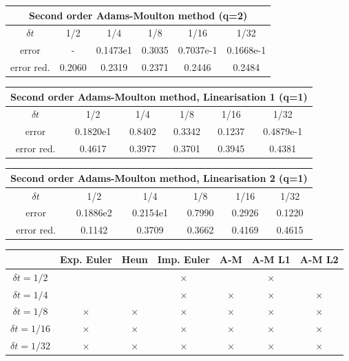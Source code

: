 \documentclass[a4paper,10pt]{article}
\begin{document}
\begin{center}
\vspace{5mm}

\begin{tabular}{ | c | c | c | c | c | c |}
		\hline
		\multicolumn{6}{|c|}{Second order Adams-Moulton method (q=2)} \\
		\hline
		$\delta t$ & 1/2 & 1/4 & 1/8 & 1/16 & 1/32\\
		\hline
		error & - & 0.1473e1 & 0.3035 & 0.7037e-1 & 0.1668e-1\\
		\hline
		error red.& 0.2060 & 0.2319 & 0.2371 & 0.2446 & 0.2484\\
		\hline
\end{tabular}

\vspace{5mm}

\begin{tabular}{ | c | c | c | c | c | c |}
		\hline
		\multicolumn{6}{|c|}{Second order Adams-Moulton method, Linearisation 1 (q=1)} \\
		\hline
		$\delta t$ & 1/2 & 1/4 & 1/8 & 1/16 & 1/32\\
		\hline
		error & 0.1820e1 & 0.8402 & 0.3342 & 0.1237 & 0.4879e-1\\
		\hline
		error red.& 0.4617 & 0.3977 & 0.3701 & 0.3945 & 0.4381\\
		\hline
\end{tabular}

\vspace{5mm}

\begin{tabular}{ | c | c | c | c | c | c |}
		\hline
		\multicolumn{6}{|c|}{Second order Adams-Moulton method, Linearisation 2 (q=1)} \\
		\hline
		$\delta t$ & 1/2 & 1/4 & 1/8 & 1/16 & 1/32\\
		\hline
		error & 0.1886e2 & 0.2154e1 & 0.7990 & 0.2926 & 0.1220\\
		\hline
		error red.& 0.1142 & 0.3709 & 0.3662 & 0.4169 & 0.4615\\
		\hline
\end{tabular}

\vspace{5mm}

\begin{tabular}{ | c | c | c | c | c | c | c |}
		\hline
		& Exp. Euler & Heun & Imp. Euler & A-M & A-M L1 & A-M L2\\
		\hline
		$\delta t = 1/2$&&&$\times$&&$\times$&\\
		\hline
		$\delta t = 1/4$&&&$\times$&$\times$&$\times$&$\times$\\
		\hline
		$\delta t = 1/8$&$\times$&$\times$&$\times$&$\times$&$\times$&$\times$\\
		\hline
		$\delta t = 1/16$&$\times$&$\times$&$\times$&$\times$&$\times$&$\times$\\
		\hline
		$\delta t = 1/32$&$\times$&$\times$&$\times$&$\times$&$\times$&$\times$\\
		\hline
\end{tabular}

\end{center}
\end{document}

